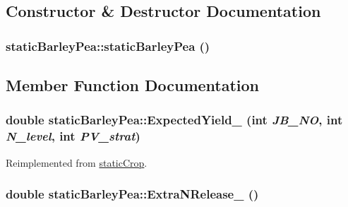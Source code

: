 \subsection{Constructor \& Destructor Documentation}
\hypertarget{classstatic_barley_pea_a9930f4c80483ceb0b35eaf9b5e708783}{
\subsubsection[{staticBarleyPea}]{\setlength{\rightskip}{0pt plus 5cm}staticBarleyPea::staticBarleyPea ()}}
\label{classstatic_barley_pea_a9930f4c80483ceb0b35eaf9b5e708783}


\subsection{Member Function Documentation}
\hypertarget{classstatic_barley_pea_a49038b3b4434096d4cf1e64c241ac214}{
\subsubsection[{ExpectedYield\_\-}]{\setlength{\rightskip}{0pt plus 5cm}double staticBarleyPea::ExpectedYield\_\- (int {\em JB\_\-NO}, \/  int {\em N\_\-level}, \/  int {\em PV\_\-strat})}}
\label{classstatic_barley_pea_a49038b3b4434096d4cf1e64c241ac214}


Reimplemented from \hyperlink{classstatic_crop_ab7b9a8ecb31b10c4dcf44f13000e2f8c}{staticCrop}.\hypertarget{classstatic_barley_pea_a8c7afa184fb792692e23bfa854214c9b}{
\subsubsection[{ExtraNRelease\_\-}]{\setlength{\rightskip}{0pt plus 5cm}double staticBarleyPea::ExtraNRelease\_\- ()}}
\label{classstatic_barley_pea_a8c7afa184fb792692e23bfa854214c9b}


